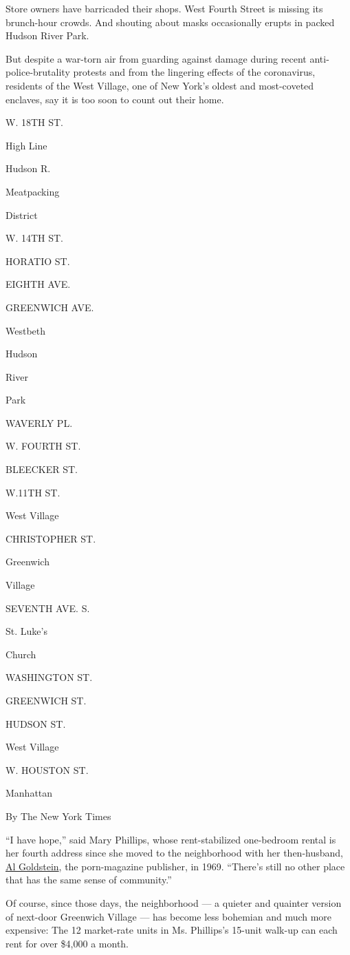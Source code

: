 Store owners have barricaded their shops. West Fourth Street is missing
its brunch-hour crowds. And shouting about masks occasionally erupts in
packed Hudson River Park.

But despite a war-torn air from guarding against damage during recent
anti-police-brutality protests and from the lingering effects of the
coronavirus, residents of the West Village, one of New York's oldest and
most-coveted enclaves, say it is too soon to count out their home.

W. 18TH ST.

High Line

Hudson R.

Meatpacking

District

W. 14TH ST.

HORATIO ST.

EIGHTH AVE.

GREENWICH AVE.

Westbeth

Hudson

River

Park

WAVERLY PL.

W. FOURTH ST.

BLEECKER ST.

W.11TH ST.

West Village

CHRISTOPHER ST.

Greenwich

Village~

SEVENTH AVE. S.

St. Luke's

Church

WASHINGTON ST.

GREENWICH ST.

HUDSON ST.

West Village

W. HOUSTON ST.

Manhattan

By The New York Times

``I have hope,'' said Mary Phillips, whose rent-stabilized one-bedroom
rental is her fourth address since she moved to the neighborhood with
her then-husband,
\href{https://www.nytimes.com/2013/12/20/nyregion/al-goldstein-pioneering-pornographer-dies-at-77.html}{Al
Goldstein}, the porn-magazine publisher, in 1969. ``There's still no
other place that has the same sense of community.''

Of course, since those days, the neighborhood --- a quieter and quainter
version of next-door Greenwich Village --- has become less bohemian and
much more expensive: The 12 market-rate units in Ms. Phillips's 15-unit
walk-up can each rent for over \$4,000 a month.

